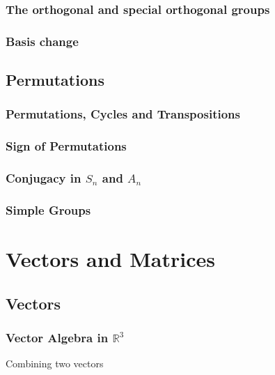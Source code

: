 \documentclass[12pt]{book}
\theoremstyle{definition}
\theoremstyle{remark}
\begin{document}
			\subsection{The orthogonal and special orthogonal groups}
			
			\subsection{Basis change}
		\section{Permutations}
			\subsection{Permutations, Cycles and Transpositions}
			
			\subsection{Sign of Permutations}
			
			\subsection{Conjugacy in $S_n$ and $A_n$}
			
			\subsection{Simple Groups}

	\chapter{Vectors and Matrices}
		
		\section{Vectors}
			\subsection{Vector Algebra in $\mathbb{R}^3$}
				Combining two vectors
			
\end{document}
